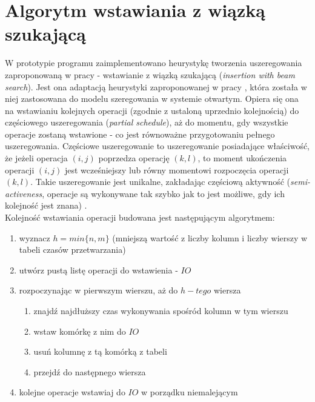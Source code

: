 \documentclass[brudnopis]{xmgr}
\begin{document}
\chapter{Algorytm wstawiania z wiązką szukającą}

W prototypie programu zaimplementowano heurystykę tworzenia uszeregowania zaproponowaną w pracy \cite{grinshpoun2014partially} - wstawianie z wiązką szukającą (\emph{insertion with beam search}).
Jest ona adaptacją heurystyki zaproponowanej w pracy \cite{brasel1993constructive}, która została w niej zastosowana do modelu szeregowania w systemie otwartym.
Opiera się ona na wstawianiu kolejnych operacji (zgodnie z ustaloną uprzednio kolejnością) do częściowego uszeregowania (\emph{partial schedule}), aż do momentu, gdy wszystkie operacje zostaną wstawione - co jest równoważne przygotowaniu pełnego uszeregowania. Częściowe uszeregowanie to uszeregowanie posiadające właściwość, że jeżeli operacja $(i,j)$ poprzedza operację $(k,l)$, to moment ukończenia operacji $(i,j)$ jest wcześniejszy lub równy momentowi rozpoczęcia operacji $(k,l)$. Takie uszeregowanie jest unikalne, zakładając częściową aktywność (\emph{semi-activeness}, operacje są wykonywane tak szybko jak to jest możliwe, gdy ich kolejność jest znana) \cite{grinshpoun2014partially}.\\

Kolejność wstawiania operacji budowana jest następującym algorytmem:
\begin{enumerate}
    \item wyznacz $h = min\{n, m\}$ (mniejszą wartość z liczby kolumn i liczby wierszy w tabeli czasów przetwarzania)
    \item utwórz pustą listę operacji do wstawienia - $IO$
    \item rozpoczynając w pierwszym wierszu, aż do $h-tego$ wiersza
    \begin{enumerate}
        \item znajdź najdłuższy czas wykonywania spośród kolumn w tym wierszu
        \item wstaw komórkę z nim do $IO$
        \item usuń kolumnę z tą komórką z tabeli
        \item przejdź do następnego wiersza
    \end{enumerate}
    \item kolejne operacje wstawiaj do $IO$ w porządku niemalejącym
\end{enumerate}
\end{document}

